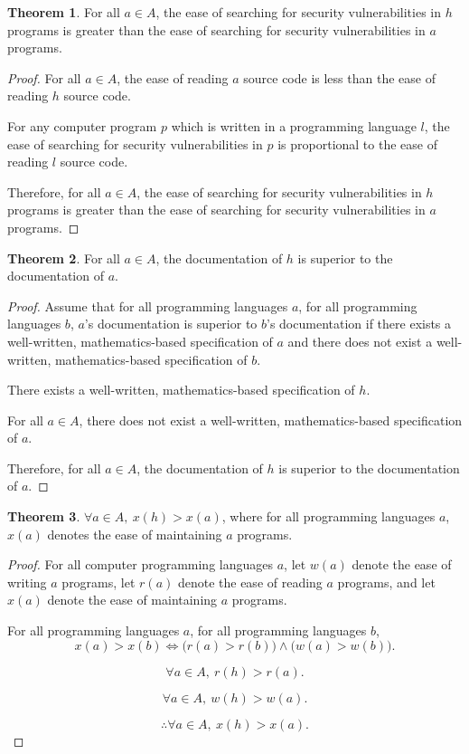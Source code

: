 \documentclass{article}
\theoremstyle{definition}
\newtheorem{thm}{Theorem}
\begin{document}
	\begin{thm}
		For all $a \in A$, the ease of searching for
		security vulnerabilities in $h$ programs is greater than the
		ease of searching for security vulnerabilities in $a$ programs.
	\end{thm}
	\begin{proof}
		For all $a \in A$, the ease of reading $a$ source code is
		less than the ease of reading $h$ source code.

		For any computer program $p$ which is written in a programming language
		$l$, the ease of searching for security vulnerabilities in $p$ is
		proportional to the ease of reading $l$ source code.

		Therefore, for all $a \in A$, the ease of searching for security
		vulnerabilities in $h$ programs is greater than the ease of searching
		for security vulnerabilities in $a$ programs.
	\end{proof}
	\begin{thm}
		For all $a \in A$, the documentation of $h$ is superior to the
		documentation of $a$.
	\end{thm}
	\begin{proof}
		Assume that for all programming languages $a$, for all programming
		languages $b$, $a$'s documentation is superior to $b$'s documentation
		if there exists a well-written, mathematics-based specification of $a$
		and there does not exist a well-written, mathematics-based
		specification of $b$.

		There exists a well-written, mathematics-based specification of $h$.

		For all $a \in A$, there does not exist a well-written,
		mathematics-based specification of $a$.

		Therefore, for all $a \in A$, the documentation of $h$ is superior to
		the documentation of $a$.
	\end{proof}
	\begin{thm}
		$\forall a \in A, \ x(h) > x(a)$, where for all programming languages
		$a$, $x(a)$ denotes the ease of maintaining $a$ programs.
	\end{thm}
	\begin{proof}
		For all computer programming languages $a$, let $w(a)$ denote the ease
		of writing $a$ programs, let $r(a)$ denote the ease of reading $a$
		programs, and let $x(a)$ denote the ease of maintaining $a$ programs.

		For all programming languages $a$, for all programming languages $b$,
		\[
			x(a) > x(b) \iff \Big(r(a) > r(b)\Big) \land \Big(w(a) > w(b)\Big).
		\]

		\[
			\forall a \in A, \ r(h) > r(a).
		\]

		\[
			\forall a \in A, \ w(h) > w(a).
		\]

		\[
			\therefore \forall a \in A, \ x(h) > x(a).
		\]
	\end{proof}
\end{document}
